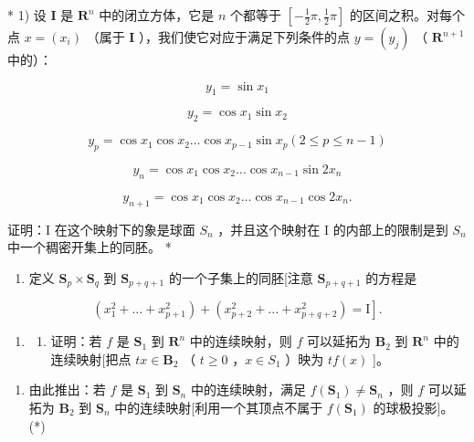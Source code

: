 \ExerciseSection

* 1) 设 \(\mathbf{I}\) 是 \(\mathbf{R}^n\) 中的闭立方体，它是 \(n\) 个都等于 \([-\frac{1}{2}\pi, \frac{1}{2}\pi]\) 的区间之积。对每个点 \(x = (x_i)\) （属于 \(\mathbf{I}\) ），我们使它对应于满足下列条件的点 \(y = (y_j)\) （ \(\mathbf{R}^{n+1}\) 中的）：

\[
y _ {1} = \sin x _ {1}
\]

\[
{y _ {2}} {= \cos x _ {1} \sin x _ {2}}
\]

\[
y _ {p} = \cos x _ {1} \cos x _ {2} \dots \cos x _ {p - 1} \sin x _ {p} (2 \leqslant p \leqslant n - 1)
\]

\[
y _ {n} = \cos x _ {1} \cos x _ {2} \dots \cos x _ {n - 1} \sin 2 x _ {n}
\]

\[
y _ {n + 1} = \cos x _ {1} \cos x _ {2} \dots \cos x _ {n - 1} \cos 2 x _ {n}.
\]

证明：I 在这个映射下的象是球面 \(S_{n}\) ，并且这个映射在 I 的内部上的限制是到 \(S_{n}\) 中一个稠密开集上的同胚。 *

\begin{enumerate}
\def\labelenumi{\arabic{enumi})}
\setcounter{enumi}{1}
\tightlist
\item
  定义 \(\mathbf{S}_p \times \mathbf{S}_q\) 到 \(\mathbf{S}_{p + q + 1}\) 的一个子集上的同胚{[}注意 \(\mathbf{S}_{p + q + 1}\) 的方程是
\end{enumerate}

\[
\left. \left(x _ {1} ^ {2} + \dots + x _ {p + 1} ^ {2}\right) + \left(x _ {p + 2} ^ {2} + \dots + x _ {p + q + 2} ^ {2}\right) = \mathrm{I} \right].
\]

\begin{enumerate}
\def\labelenumi{\arabic{enumi})}
\setcounter{enumi}{2}
\tightlist
\item
  \begin{enumerate}
  \def\labelenumii{\alph{enumii})}
  \tightlist
  \item
    证明：若 \(f\) 是 \(\mathbf{S}_1\) 到 \(\mathbf{R}^n\) 中的连续映射，则 \(f\) 可以延拓为 \(\mathbf{B}_2\) 到 \(\mathbf{R}^n\) 中的连续映射{[}把点 \(tx \in \mathbf{B}_2\) （ \(t \geqslant 0\) ，\(x \in S_1\) ）映为 \(tf(x)\) {]}。
  \end{enumerate}
\end{enumerate}

\begin{enumerate}
\def\labelenumi{\alph{enumi})}
\setcounter{enumi}{1}
\tightlist
\item
  由此推出：若 \(f\) 是 \(\mathbf{S}_1\) 到 \(\mathbf{S}_n\) 中的连续映射，满足 \(f(\mathbf{S}_1) \neq \mathbf{S}_n\) ，则 \(f\) 可以延拓为 \(\mathbf{B}_2\) 到 \(\mathbf{S}_n\) 中的连续映射{[}利用一个其顶点不属于 \(f(\mathbf{S}_1)\) 的球极投影{]}。(*)
\end{enumerate}

